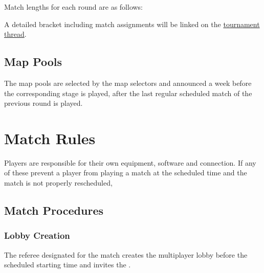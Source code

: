 \begin{samepage}
Match lengths for each round are as follows:
\matchlengths
\end{samepage}

\custombracketpost

A detailed bracket including match assignments will be linked on the \href{\thread}{tournament thread}.

\subsection{Map Pools}


\custommappool

The map pools are selected by the map selectors and announced a week before the corresponding stage is played, after the last regular scheduled match of the previous round is played.

\section{Match Rules}

Players are responsible for their own equipment, software and connection. If any of these prevent a player from playing a match at the scheduled time and the match is not properly rescheduled, 

\subsection{Match Procedures}

\subsubsection{Lobby Creation}
The referee designated for the match creates the multiplayer lobby \lobbyopen{} before the scheduled starting time and invites the .

